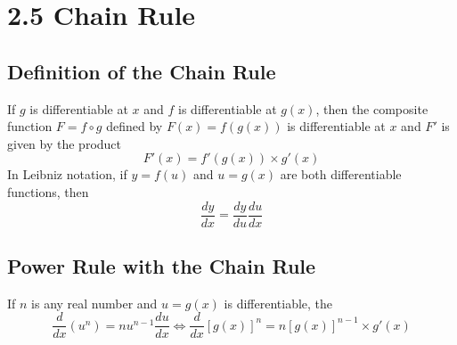 %
%

\section*{2.5 Chain Rule}

\subsection*{Definition of the Chain Rule}

If \(g\) is differentiable at \(x\) and \(f\) is differentiable at \(g(x)\), then the composite function \(F=f \circ g\) defined by \(F(x)=f(g(x))\) is differentiable at \(x\) and \(F'\) is given by the product 
$$F'(x)=f'(g(x)) \times g'(x)$$
In Leibniz notation, if \(y=f(u)\) and \(u=g(x)\) are both differentiable functions, then
$$ \frac{dy}{dx}=\frac{dy}{du}\frac{du}{dx} $$

\subsection*{Power Rule with the Chain Rule}

If \(n\) is any real number and \(u=g(x)\) is differentiable, the 
$$\frac{d}{dx}(u^n)=nu^{n-1}\frac{du}{dx} \Leftrightarrow \frac{d}{dx}{[g(x)]}^n=n{[g(x)]}^{n-1} \times g'(x)$$
